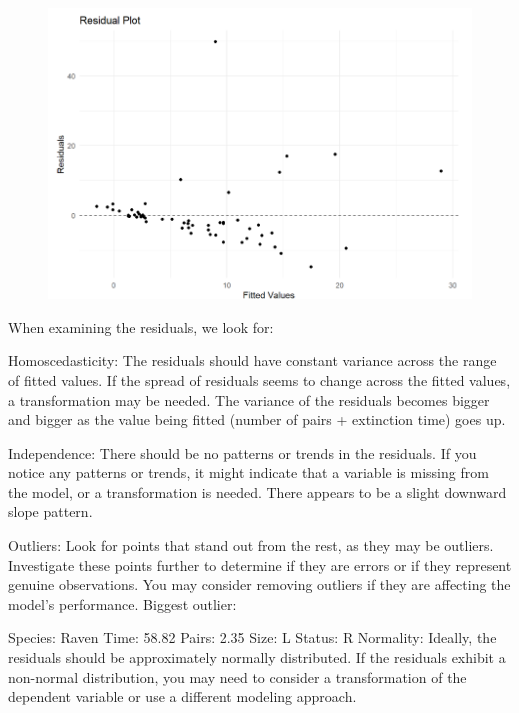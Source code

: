 \documentclass{article}
\begin{document}
\begin{figure}
    \includegraphics[width=\linewidth]{graphs/residual.png}
\end{figure}


When examining the residuals, we look for:

Homoscedasticity: The residuals should have constant variance across the range of fitted values. If the spread of residuals seems to change across the fitted values, a transformation may be needed.
The variance of the residuals becomes bigger and bigger as the value being fitted (number of pairs + extinction time) goes up.

Independence: There should be no patterns or trends in the residuals. If you notice any patterns or trends, it might indicate that a variable is missing from the model, or a transformation is needed.
There appears to be a slight downward slope pattern.

Outliers: Look for points that stand out from the rest, as they may be outliers. Investigate these points further to determine if they are errors or if they represent genuine observations. You may consider removing outliers if they are affecting the model’s performance.
Biggest outlier:

Species: Raven
Time: 58.82
Pairs: 2.35
Size: L
Status: R
Normality: Ideally, the residuals should be approximately normally distributed. If the residuals exhibit a non-normal distribution, you may need to consider a transformation of the dependent variable or use a different modeling approach.
\end{document}
